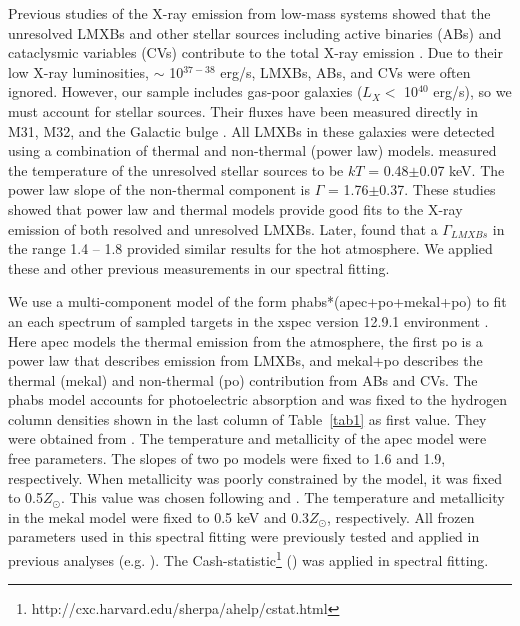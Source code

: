 \documentclass[iop]{emulateapj}
\begin{document}
Previous studies of the X-ray emission from low-mass systems showed that the unresolved LMXBs and other stellar sources including active binaries (ABs) and cataclysmic variables (CVs) contribute to the total X-ray emission \citep{Pellegrini:94, Revnivtsev:08a}.  Due to their low X-ray luminosities, $\sim$ 10$^{37-38}$ erg/s, LMXBs, ABs, and CVs were often ignored.  However, our sample includes gas-poor galaxies ($L_X < $ 10$^{40}$ erg/s), so we must account for stellar sources. Their fluxes have been measured directly in M31, M32, and the Galactic bulge \citep{Revnivtsev:07a, Boroson:10}. All LMXBs in these galaxies were detected using a combination of thermal and non-thermal (power law) models. \citet{Revnivtsev:08a} measured the temperature of the unresolved stellar sources to be $kT$ = 0.48$\pm$0.07 keV.   The power law slope of the non-thermal component is $\Gamma$ = 1.76$\pm$0.37. These studies showed that power law and thermal models provide good fits to the X-ray emission of both resolved and unresolved LMXBs. Later, \citet{Wong:14} found that a $\Gamma_{LMXBs}$ in the range 1.4 -- 1.8 provided similar results for the hot atmosphere. We applied these and other previous measurements in our spectral fitting.

We use a multi-component model of the form {\sc phabs*(apec+po+mekal+po)} to fit an each spectrum of sampled targets in the {\sc xspec} version 12.9.1 environment \citep{Arnaud:96}. Here {\sc apec} models the thermal emission from the atmosphere, the first {\sc po} is a power law that describes emission from LMXBs, and {\sc mekal+po} describes the thermal ({\sc mekal}) and non-thermal ({\sc po}) contribution from ABs and CVs. The {\sc phabs} model accounts for photoelectric absorption and was fixed to the hydrogen column densities shown in the last column of Table~\ref{tab1} as first value.  They were obtained from \citet{Dickey:90}. The temperature and metallicity of the {\sc apec} model were free parameters. The slopes of two {\sc po} models were fixed to 1.6 and 1.9, respectively.  When metallicity was poorly constrained by the model, it was fixed to 0.5$Z_{\odot}$.  This value was chosen following \citet{Boroson:10} and \citet{Werner:12}. The temperature and metallicity in the {\sc mekal} model were fixed to 0.5 keV and 0.3$Z_{\odot}$, respectively. All frozen parameters used in this spectral fitting were previously tested and applied in previous analyses (e.g. \citealt{Revnivtsev:08a, Boroson:10, Kim:13, Wong:14}). The Cash-statistic\footnote{http://cxc.harvard.edu/sherpa/ahelp/cstat.html} (\citealt{Cash:79}) was applied in spectral fitting. 
\end{document}

